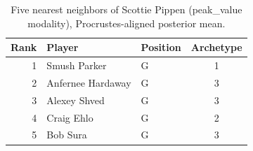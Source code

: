 \begin{table}[htbp]
  \centering\small
  \begin{tabular}{rllc}
    \toprule
    Rank & Player & Position & Archetype \\
    \midrule
    1 & Smush Parker & G & 1 \\
    2 & Anfernee Hardaway & G & 3 \\
    3 & Alexey Shved & G & 3 \\
    4 & Craig Ehlo & G & 2 \\
    5 & Bob Sura & G & 3 \\
    \bottomrule
  \end{tabular}
  \caption{Five nearest neighbors of Scottie Pippen (peak_value modality), Procrustes-aligned posterior mean.}
  \label{tab:Scottie_Pippen_neighbors_peak_value}
\end{table}

